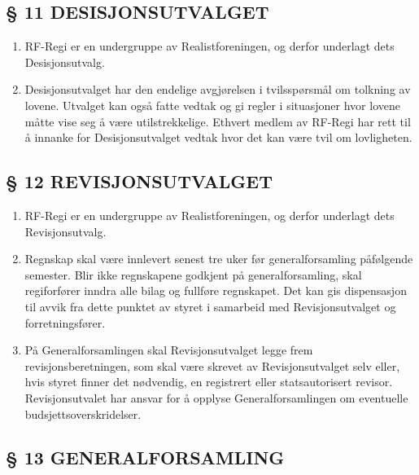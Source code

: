 \documentclass[a4paper,11pt,norsk]{scrartcl}
\begin{document}
\subsection{§ 11 DESISJONSUTVALGET%
  \label{desisjonsutvalget}%
}

\begin{enumerate}
\renewcommand{\labelenumi}{\alph{enumi})}
\item RF-Regi er en undergruppe av Realistforeningen, og derfor underlagt dets
Desisjonsutvalg.

\item Desisjonsutvalget har den endelige avgjørelsen i tvilsspørsmål om
tolkning av lovene. Utvalget kan også fatte vedtak og gi regler i
situasjoner hvor lovene måtte vise seg å være utilstrekkelige.
Ethvert medlem av RF-Regi har rett til å innanke for
Desisjonsutvalget vedtak hvor det kan være tvil om lovligheten.
\end{enumerate}


\subsection{§ 12 REVISJONSUTVALGET%
  \label{revisjonsutvalget}%
}

\begin{enumerate}
\renewcommand{\labelenumi}{\alph{enumi})}
\item RF-Regi er en undergruppe av Realistforeningen, og derfor underlagt dets
Revisjonsutvalg.

\item Regnskap skal være innlevert senest tre uker før generalforsamling påfølgende
semester. Blir ikke regnskapene godkjent på generalforsamling, skal
regiforfører inndra alle bilag og fullføre regnskapet. Det kan gis dispensasjon
til avvik fra dette punktet av styret i samarbeid med Revisjonsutvalget og forretningsfører.

\item På Generalforsamlingen skal Revisjonsutvalget legge frem revisjonsberetningen,
som skal være skrevet av Revisjonsutvalget selv eller, hvis styret finner det
nødvendig, en registrert eller statsautorisert revisor. Revisjonsutvalet
har ansvar for å opplyse Generalforsamlingen om eventuelle budsjettsoverskridelser.
\end{enumerate}


\subsection{§ 13 GENERALFORSAMLING%
  \label{generalforsamling}%
}
\end{document}
